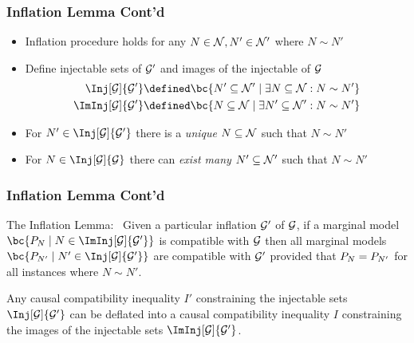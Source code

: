 \documentclass[
    hyperref={bookmarks=false},%
    xcolor={dvipsnames},
]{beamer}
\renewcommand{\term}[1]{\textcolor{Mahogany}{#1}}
\begin{document}
\begin{frame}
    \frametitle{Inflation Lemma Cont'd}
    \begin{itemize}
        \item Inflation procedure holds for any $N \in \mathcal{N}, N' \in \mathcal{N}'$ where $N \sim N'$
        \item Define \term{injectable sets of $\mathcal{G}'$} and \term{images of the injectable of $\mathcal{G}$}
        \begin{align*}
            \Inj[\graph]{\graph'} &\defined \bc{N' \subseteq \nodes' \mid \exists N \subseteq \nodes : N \sim N'} \\
            \ImInj[\graph]{\graph'} &\defined \bc{N \subseteq \nodes \mid \exists N' \subseteq \nodes' : N \sim N'} \\
        \end{align*}
        \item For $N' \in \Inj[\graph]{\graph'}$ there is a \textit{unique} $N \subseteq \mathcal{N}$ such that $N \sim N'$
        \item For $N \in \Inj[\graph]{\graph}$ there can \textit{exist many} $N' \subseteq \mathcal{N}'$ such that $N \sim N'$
    \end{itemize}
\end{frame}

\begin{frame}
    \frametitle{Inflation Lemma Cont'd}
    \begin{lemma}
        \term{The Inflation Lemma:}~\cite[lemma 3]{Inflation} Given a particular inflation $\mathcal{G}'$ of $\mathcal{G}$, if a marginal model $\bc{\prob[N] \mid N \in \ImInj[\graph]{\graph'}}$ is compatible with $\mathcal{G}$ then all marginal models $\bc{\prob[N'] \mid N' \in \Inj[\graph]{\graph'}}$ are compatible with $\mathcal{G}'$ provided that $\prob[N] = \prob[N']$ for all instances where $N \sim N'$.
    \end{lemma}
    \begin{corollary}
        Any causal compatibility inequality $I'$ constraining the injectable sets $\Inj[\graph]{\graph'}$ can be \term{deflated} into a causal compatibility inequality $I$ constraining the images of the injectable sets $\ImInj[\graph]{\graph'}$.
    \end{corollary}
\end{frame}
\end{document}
